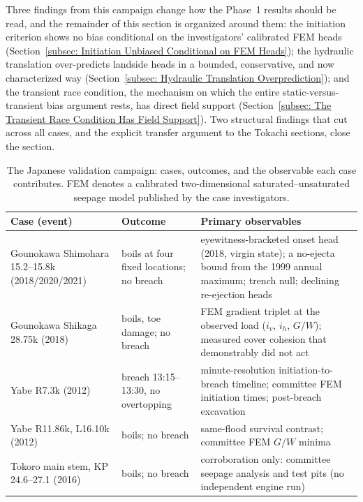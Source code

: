 Three findings from this campaign change how the Phase~1 results should be
read, and the remainder of this section is organized around them: the
initiation criterion shows no bias conditional on the investigators'
calibrated FEM heads
(Section~\ref{subsec: Initiation Unbiased Conditional on FEM Heads}); the
hydraulic translation over-predicts landside heads in a bounded, conservative,
and now characterized way
(Section~\ref{subsec: Hydraulic Translation Overprediction}); and the
transient race condition, the mechanism on which the entire
static-versus-transient bias argument rests, has direct field support
(Section~\ref{subsec: The Transient Race Condition Has Field Support}). Two
structural findings that cut across all cases, and the explicit transfer
argument to the Tokachi sections, close the section.

\begin{table}[htbp]
\centering
\caption{The Japanese validation campaign: cases, outcomes, and the
observable each case contributes. FEM denotes a calibrated two-dimensional
saturated--unsaturated seepage model published by the case investigators.}
\label{tab: japanese validation campaign overview}
\small
\begin{tabular}{p{} p{} p{}}
\hline
Case (event) & Outcome & Primary observables \\
\hline
Gounokawa Shimohara 15.2--15.8k (2018/2020/2021) &
boils at four fixed locations; no breach &
eyewitness-bracketed onset head (2018, virgin state); a no-ejecta bound from
the 1999 annual maximum; trench null; declining re-ejection heads \\
Gounokawa Shikaga 28.75k (2018) &
boils, toe damage; no breach &
FEM gradient triplet at the observed load ($i_v$, $i_h$, $G/W$); measured
cover cohesion that demonstrably did not act \\
Yabe R7.3k (2012) &
breach 13:15--13:30, no overtopping &
minute-resolution initiation-to-breach timeline; committee FEM initiation
times; post-breach excavation \\
Yabe R11.86k, L16.10k (2012) &
boils; no breach &
same-flood survival contrast; committee FEM $G/W$ minima \\
Tokoro main stem, KP\,24.6--27.1 (2016) &
boils; no breach &
corroboration only: committee seepage analysis and test pits (no independent
engine run) \\
\hline
\end{tabular}
\end{table}

